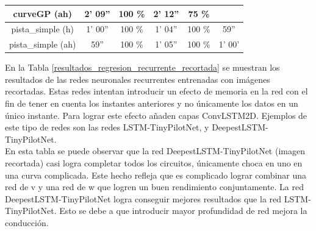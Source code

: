 \begin{table}[H]
\begin{tabular}{c|c|c|c|c|c|}
\multicolumn{1}{|c|}{curveGP (ah)}       & 2' 09''            & 100 \%         & 2' 12''        & 75 \%        &         \\ \hline
\multicolumn{1}{|c|}{pista\_simple (h)}       & 1' 00''           & 100 \%       & 1' 04''            & 100 \%         & 59''        \\ \hline
\multicolumn{1}{|c|}{pista\_simple (ah)}     & 59''          & 100 \%       & 1' 05''         & 100 \%        & 1' 00'                 \\ \hline
\end{tabular}
\end{table}



En la Tabla \ref{resultados_regresion_recurrente_recortada} se muestran los resultados de las redes neuronales recurrentes entrenadas con imágenes recortadas. Estas redes intentan introducir un efecto de memoria en la red con el fin de tener en cuenta los instantes anteriores y no únicamente los datos en un único instante. Para lograr este efecto añaden capas ConvLSTM2D. Ejemplos de este tipo de redes son las redes LSTM-TinyPilotNet, y DeepestLSTM-TinyPilotNet.\\

En esta tabla se puede observar que la red DeepestLSTM-TinyPilotNet (imagen recortada) casi logra completar todos los circuitos, únicamente choca en uno en una curva complicada. Este hecho refleja que es complicado lograr combinar una red de v y una red de w que logren un buen rendimiento conjuntamente. La red DeepestLSTM-TinyPilotNet logra conseguir mejores resultados que la red LSTM-TinyPilotNet. Esto se debe a que introducir mayor profundidad de red mejora la conducción. \\


